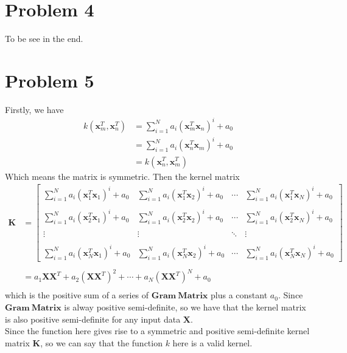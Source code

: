 \documentclass{article}
\begin{document}
\section*{Problem 4}
To be see in the end.


\section*{Problem 5}
Firstly, we have
\begin{equation}
	\begin{aligned}
		k(\bm{x}_m^T, \bm{x}_n^T)
		&= \sum_{i=1}^{N} a_i (\bm{x}_m^T\bm{x}_n)^i + a_0\\
		&= \sum_{i=1}^{N} a_i (\bm{x}_n^T\bm{x}_m)^i + a_0\\
		&=k(\bm{x}_n^T, \bm{x}_m^T)
	\end{aligned}
\end{equation}
Which means the matrix is symmetric. Then the kernel matrix
\begin{equation}
	\begin{aligned}
		\bm{K} 
		&= \left[
		\begin{matrix}
		\sum_{i=1}^{N} a_i (\bm{x}_1^T\bm{x}_1)^i + a_0 & \sum_{i=1}^{N} a_i (\bm{x}_1^T\bm{x}_2)^i + a_0 & \cdots & \sum_{i=1}^{N} a_i (\bm{x}_1^T\bm{x}_N)^i + a_0 \\
		\\
		\sum_{i=1}^{N} a_i (\bm{x}_2^T\bm{x}_1)^i + a_0 & \sum_{i=1}^{N} a_i (\bm{x}_2^T\bm{x}_2)^i + a_0 & \cdots & \sum_{i=1}^{N} a_i (\bm{x}_2^T\bm{x}_N)^i + a_0 \\
		\\
		\vdots & \vdots & \ddots & \vdots \\
		\\
		\sum_{i=1}^{N} a_i (\bm{x}_N^T\bm{x}_1)^i + a_0 & \sum_{i=1}^{N} a_i (\bm{x}_N^T\bm{x}_2)^i + a_0 & \cdots & \sum_{i=1}^{N} a_i (\bm{x}_N^T\bm{x}_N)^i + a_0
		\end{matrix}
		\right]\\
		\\
		&= a_1\bm{X}\bm{X}^T + a_2(\bm{X}\bm{X}^T)^2 + \cdots + a_N(\bm{X}\bm{X}^T)^N + a_0\\
	\end{aligned}
\end{equation}
which is the positive sum of a series of $\bm{Gram \ Matrix}$ plus a constant $a_0$. Since $\bm{Gram \ Matrix}$ is alway positive semi-definite, so we have that the kernel matrix is also positive semi-definite for any input data $\bm{X}$.\\
Since the function here gives rise to a symmetric and positive semi-definite kernel matrix $\bm{K}$, so we can say that the function $k$ here is a valid kernel.
\end{document}
